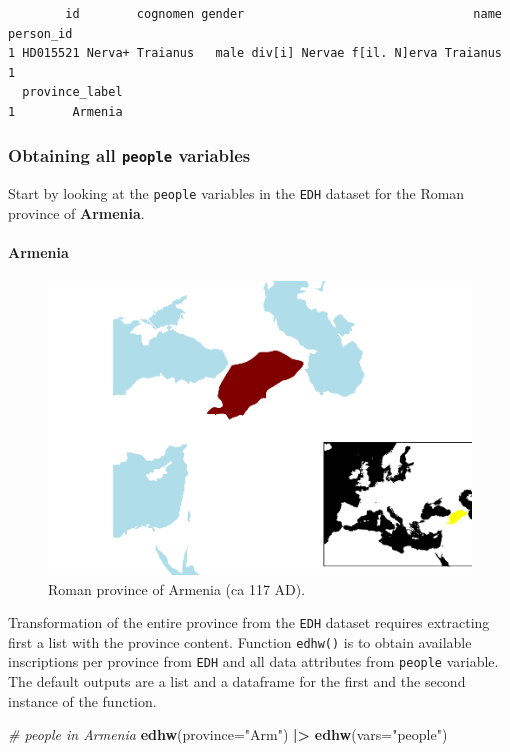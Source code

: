 \documentclass[a4paper,11pt]{memoir}
\newenvironment{Shaded}{\begin{snugshade}}{\end{snugshade}}
\newcommand{\CommentTok}[1]{\textcolor[rgb]{0.56,0.35,0.01}{\textit{#1}}}
\newcommand{\DataTypeTok}[1]{\textcolor[rgb]{0.13,0.29,0.53}{#1}}
\newcommand{\ErrorTok}[1]{\textcolor[rgb]{0.64,0.00,0.00}{\textbf{#1}}}
\newcommand{\KeywordTok}[1]{\textcolor[rgb]{0.13,0.29,0.53}{\textbf{#1}}}
\newcommand{\NormalTok}[1]{#1}
\newcommand{\OperatorTok}[1]{\textcolor[rgb]{0.81,0.36,0.00}{\textbf{#1}}}
\newcommand{\StringTok}[1]{\textcolor[rgb]{0.31,0.60,0.02}{#1}}
\let\oldparagraph\paragraph
\renewcommand{\paragraph}[1]{\oldparagraph{#1}\mbox{}}
\begin{document}
\begin{verbatim}
        id        cognomen gender                                name person_id
1 HD015521 Nerva+ Traianus   male div[i] Nervae f[il. N]erva Traianus         1
  province_label
1        Armenia
\end{verbatim}

\hypertarget{obtaining-all-people-variables}{%
\subsubsection{\texorpdfstring{Obtaining all \texttt{people}
variables}{Obtaining all people variables}}\label{obtaining-all-people-variables}}

Start by looking at the \texttt{people} variables in the \texttt{EDH}
dataset for the Roman province of \textbf{Armenia}.

\hypertarget{armenia}{%
\paragraph{Armenia}\label{armenia}}

\begin{figure}

{\centering
\includegraphics[width=0.25\linewidth, trim=0 0 0 0, clip]{img/unnamed-chunk-15-1} %

}

\caption{Roman province of Armenia (ca 117 AD).}\label{fig:unnamed-chunk-15}
\end{figure}

Transformation of the entire province from the \texttt{EDH} dataset
requires extracting first a list with the province content. Function
\texttt{edhw()} is to obtain available inscriptions per province from
\texttt{EDH} and all data attributes from \texttt{people} variable. The
default outputs are a list and a dataframe for the first and the second
instance of the function.

\begin{Shaded}
\begin{Highlighting}[]
\CommentTok{# people in Armenia}
\KeywordTok{edhw}\NormalTok{(}\DataTypeTok{province=}\StringTok{"Arm"}\NormalTok{) }\OperatorTok{|}\ErrorTok{>}\StringTok{ }
\StringTok{  }\KeywordTok{edhw}\NormalTok{(}\DataTypeTok{vars=}\StringTok{"people"}\NormalTok{)}
\end{Highlighting}
\end{Shaded}
\end{document}
